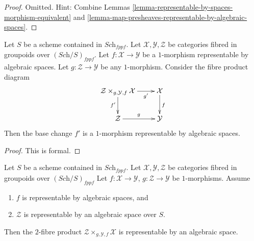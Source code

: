 \begin{proof}
Omitted. Hint: Combine
Lemmas \ref{lemma-representable-by-spaces-morphism-equivalent}
and \ref{lemma-map-presheaves-representable-by-algebraic-spaces}.
\end{proof}

\begin{lemma}
\label{lemma-base-change-representable-by-spaces}
Let $S$ be a scheme contained in $\textit{Sch}_{fppf}$.
Let $\mathcal{X}, \mathcal{Y}, \mathcal{Z}$
be categories fibred in groupoids over $(\textit{Sch}/S)_{fppf}$.
Let $f : \mathcal{X} \to \mathcal{Y}$ be a $1$-morphism
representable by algebraic spaces.
Let $g : \mathcal{Z} \to \mathcal{Y}$ be any $1$-morphism.
Consider the fibre product diagram
$$
\xymatrix{
\mathcal{Z} \times_{g, \mathcal{Y}, f} \mathcal{X} \ar[r]_-{g'} \ar[d]_{f'} &
\mathcal{X} \ar[d]^f \\
\mathcal{Z} \ar[r]^g & \mathcal{Y}
}
$$
Then the base change $f'$ is a $1$-morphism representable by
algebraic spaces.
\end{lemma}

\begin{proof}
This is formal.
\end{proof}

\begin{lemma}
\label{lemma-base-change-by-space-representable-by-space}
Let $S$ be a scheme contained in $\textit{Sch}_{fppf}$.
Let $\mathcal{X}, \mathcal{Y}, \mathcal{Z}$
be categories fibred in groupoids over $(\textit{Sch}/S)_{fppf}$
Let $f : \mathcal{X} \to \mathcal{Y}$,
$g : \mathcal{Z} \to \mathcal{Y}$ be $1$-morphisms.
Assume
\begin{enumerate}
\item $f$ is representable by algebraic spaces, and
\item $\mathcal{Z}$ is representable by an algebraic space over $S$.
\end{enumerate}
Then the $2$-fibre product
$\mathcal{Z} \times_{g, \mathcal{Y}, f} \mathcal{X}$
is representable by an algebraic space.
\end{lemma}

